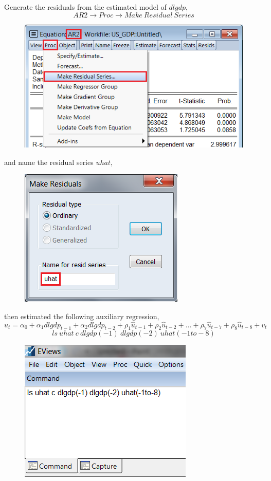 \documentclass[12pt]{report}
\begin{document}
\noindent Generate the residuals from the estimated model of $dlgdp$, $$AR2 \to Proc \to Make\ Residual\ Series$$
\begin{figure}[H]
	\centerline{\includegraphics{tute11_27}}
\end{figure}
\vspace{-\baselineskip} \noindent and name the residual series $uhat$,
\begin{figure}[H]
	\centerline{\includegraphics{tute11_28}}
\end{figure}
\vspace{-\baselineskip} \noindent then estimated the following auxiliary regression, $$\hat{u}_t = \alpha_0 + \alpha_1dlgdp_{t-1} + \alpha_2dlgdp_{t-2} + \rho_1\hat{u}_{t-1} + \rho_2\hat{u}_{t-2} + \dots + \rho_7\hat{u}_{t-7} + \rho_8\hat{u}_{t-8} + v_t$$ $$ls\ uhat\ c\ dlgdp(-1)\ dlgdp(-2)\ uhat(-1to-8)$$ \begin{figure}[H]
	\centerline{\includegraphics{tute11_29}}
\end{figure}
\end{document}
